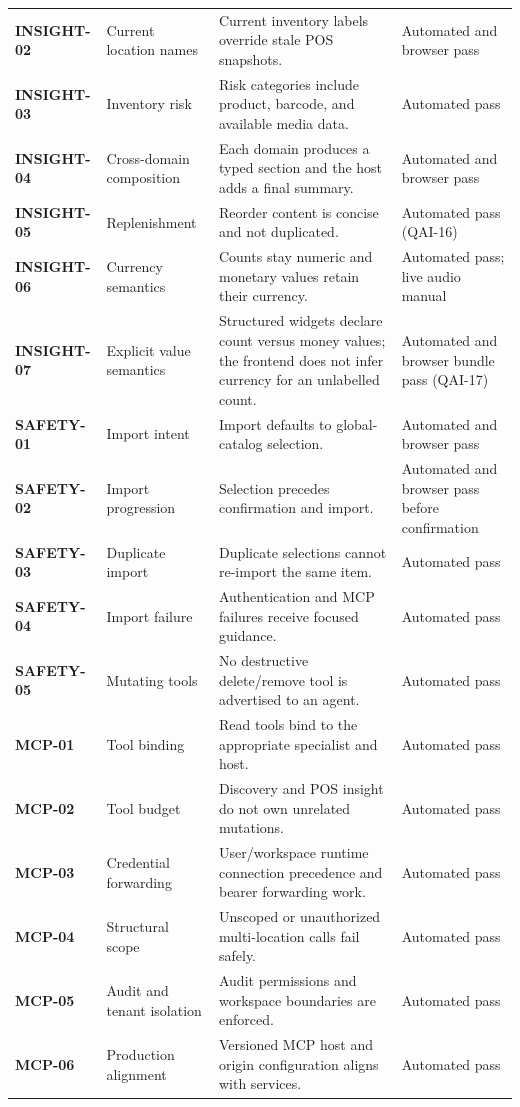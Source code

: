 \documentclass[10pt]{article}
\begin{document}
\begin{longtable}{@{}>{\bfseries\color{navy}}p{}@{\hspace{0.7em}} p{}@{\hspace{0.7em}} p{}@{\hspace{0.7em}} p{}@{}}
INSIGHT-02 & Current location names & Current inventory labels override stale POS snapshots. & Automated and browser pass \\
INSIGHT-03 & Inventory risk & Risk categories include product, barcode, and available media data. & Automated pass \\
INSIGHT-04 & Cross-domain composition & Each domain produces a typed section and the host adds a final summary. & Automated and browser pass \\
INSIGHT-05 & Replenishment & Reorder content is concise and not duplicated. & Automated pass (QAI-16) \\
INSIGHT-06 & Currency semantics & Counts stay numeric and monetary values retain their currency. & Automated pass; live audio manual \\
INSIGHT-07 & Explicit value semantics & Structured widgets declare count versus money values; the frontend does not infer currency for an unlabelled count. & Automated and browser bundle pass (QAI-17) \\
SAFETY-01 & Import intent & Import defaults to global-catalog selection. & Automated and browser pass \\
SAFETY-02 & Import progression & Selection precedes confirmation and import. & Automated and browser pass before confirmation \\
SAFETY-03 & Duplicate import & Duplicate selections cannot re-import the same item. & Automated pass \\
SAFETY-04 & Import failure & Authentication and MCP failures receive focused guidance. & Automated pass \\
SAFETY-05 & Mutating tools & No destructive delete/remove tool is advertised to an agent. & Automated pass \\
MCP-01 & Tool binding & Read tools bind to the appropriate specialist and host. & Automated pass \\
MCP-02 & Tool budget & Discovery and POS insight do not own unrelated mutations. & Automated pass \\
MCP-03 & Credential forwarding & User/workspace runtime connection precedence and bearer forwarding work. & Automated pass \\
MCP-04 & Structural scope & Unscoped or unauthorized multi-location calls fail safely. & Automated pass \\
MCP-05 & Audit and tenant isolation & Audit permissions and workspace boundaries are enforced. & Automated pass \\
MCP-06 & Production alignment & Versioned MCP host and origin configuration aligns with services. & Automated pass \\

\end{longtable}
\end{document}
